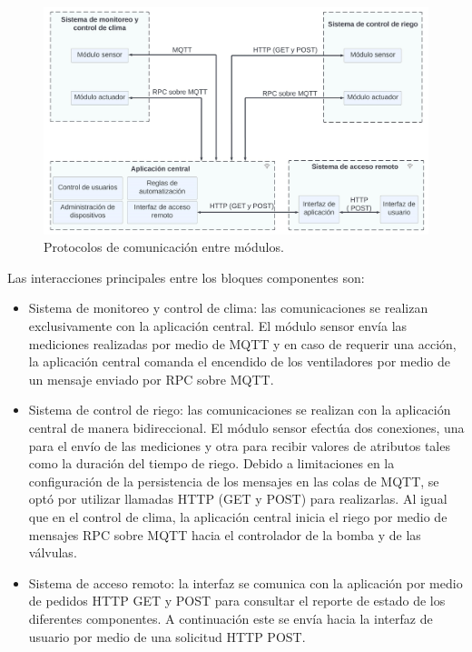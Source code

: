 \begin{figure}[h]
	\centering
	\includegraphics[width=1.0\textwidth]{./Figures/blockproto.jpeg}
	\caption[Protocolos de comunicación entre módulos.]{Protocolos de comunicación entre módulos.}
	\label{fig:blockprotos}
\end{figure}


\pagebreak
Las interacciones principales entre los bloques componentes son:
 
 \begin{itemize}
	\item Sistema de monitoreo y control de clima: las comunicaciones se realizan exclusivamente con la aplicación central.
	El módulo sensor envía las mediciones realizadas por medio de MQTT y en caso de requerir una acción, la aplicación central comanda el encendido de los ventiladores por medio de un mensaje enviado por RPC \citep{rfc1057} sobre MQTT.
	
	\item Sistema de control de riego: las comunicaciones se realizan con la aplicación central de manera bidireccional.
	El módulo sensor efectúa dos conexiones, una para el envío de las mediciones y otra para recibir valores de atributos tales como la duración del tiempo de riego. Debido a limitaciones en la configuración de la persistencia de los mensajes en las colas de MQTT, se optó por utilizar llamadas HTTP (GET y POST) para realizarlas.
	Al igual que en el control de clima, la aplicación central inicia el riego por medio de mensajes RPC sobre MQTT hacia el controlador de la bomba y de las válvulas.
	
	\item Sistema de acceso remoto: la interfaz se comunica con la aplicación por medio de pedidos HTTP GET y POST para consultar el reporte de estado de los diferentes componentes. A continuación este se envía hacia la interfaz de usuario por medio de una solicitud HTTP POST.
 
 
 
 
 \end{itemize}






